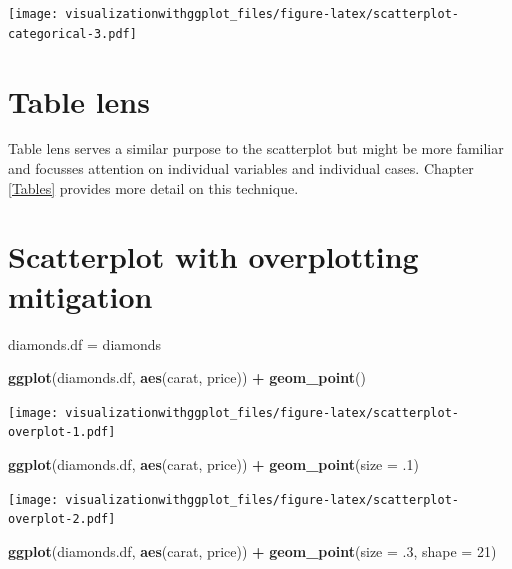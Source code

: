 \documentclass[]{krantz}
\makeatletter
\newenvironment{Shaded}{\begin{snugshade}}{\end{snugshade}}
\newcommand{\KeywordTok}[1]{\textcolor[rgb]{0.13,0.29,0.53}{\textbf{#1}}}
\newcommand{\DataTypeTok}[1]{\textcolor[rgb]{0.13,0.29,0.53}{#1}}
\newcommand{\DecValTok}[1]{\textcolor[rgb]{0.00,0.00,0.81}{#1}}
\newcommand{\StringTok}[1]{\textcolor[rgb]{0.31,0.60,0.02}{#1}}
\newcommand{\OperatorTok}[1]{\textcolor[rgb]{0.81,0.36,0.00}{\textbf{#1}}}
\newcommand{\NormalTok}[1]{#1}
\newenvironment{kframe}{%
\medskip{}
\setlength{\fboxsep}{.8em}
 \def\at@end@of@kframe{}%
 \ifinner\ifhmode%
  \def\at@end@of@kframe{\end{minipage}}%
  \begin{minipage}{\columnwidth}%
 \fi\fi%
 \def\FrameCommand##1{\hskip\@totalleftmargin \hskip-\fboxsep
 \colorbox{shadecolor}{##1}\hskip-\fboxsep
     \hskip-\linewidth \hskip-\@totalleftmargin \hskip\columnwidth}%
 \MakeFramed {\advance\hsize-\width
   \@totalleftmargin\z@ \linewidth\hsize
   \@setminipage}}%
 {\par\unskip\endMakeFramed%
 \at@end@of@kframe}
\renewenvironment{Shaded}{\begin{kframe}}{\end{kframe}}
\theoremstyle{definition}
\theoremstyle{definition}
\theoremstyle{definition}
\theoremstyle{remark}
\makeatother
\begin{document}
\texttt{[image: visualizationwithggplot\_files/figure-latex/scatterplot-categorical-3.pdf]}

\section{Table lens}\label{table-lens}

Table lens serves a similar purpose to the scatterplot but might be more
familiar and focusses attention on individual variables and individual
cases. Chapter \ref{Tables} provides more detail on this technique.

\hypertarget{htmlwidget-8b255151ac9d79a9c02d}{}

\section{Scatterplot with overplotting
mitigation}\label{scatterplot-with-overplotting-mitigation}

\begin{Shaded}
\begin{Highlighting}[]
\NormalTok{diamonds.df =}\StringTok{ }\NormalTok{diamonds}

\KeywordTok{ggplot}\NormalTok{(diamonds.df, }\KeywordTok{aes}\NormalTok{(carat, price)) }\OperatorTok{+}
\StringTok{  }\KeywordTok{geom_point}\NormalTok{()}
\end{Highlighting}
\end{Shaded}

\texttt{[image: visualizationwithggplot\_files/figure-latex/scatterplot-overplot-1.pdf]}

\begin{Shaded}
\begin{Highlighting}[]
\KeywordTok{ggplot}\NormalTok{(diamonds.df, }\KeywordTok{aes}\NormalTok{(carat, price)) }\OperatorTok{+}
\StringTok{  }\KeywordTok{geom_point}\NormalTok{(}\DataTypeTok{size =}\NormalTok{ .}\DecValTok{1}\NormalTok{)}
\end{Highlighting}
\end{Shaded}

\texttt{[image: visualizationwithggplot\_files/figure-latex/scatterplot-overplot-2.pdf]}

\begin{Shaded}
\begin{Highlighting}[]
\KeywordTok{ggplot}\NormalTok{(diamonds.df, }\KeywordTok{aes}\NormalTok{(carat, price)) }\OperatorTok{+}
\StringTok{  }\KeywordTok{geom_point}\NormalTok{(}\DataTypeTok{size =}\NormalTok{ .}\DecValTok{3}\NormalTok{, }\DataTypeTok{shape =} \DecValTok{21}\NormalTok{)}
\end{Highlighting}
\end{Shaded}
\end{document}
